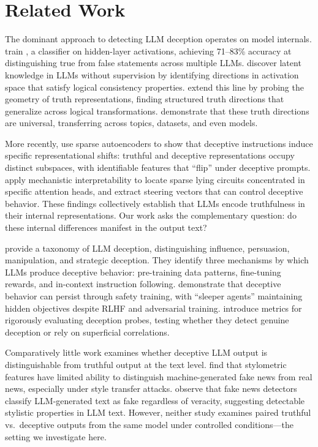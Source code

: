 \section{Related Work}
\label{sec:related}

The dominant approach to detecting LLM deception operates on model internals. \citet{azaria2023internal} train \saplma, a classifier on hidden-layer activations, achieving 71--83\% accuracy at distinguishing true from false statements across multiple LLMs. \citet{burns2023discovering} discover latent knowledge in LLMs without supervision by identifying directions in activation space that satisfy logical consistency properties. \citet{marks2025probing} extend this line by probing the geometry of truth representations, finding structured truth directions that generalize across logical transformations. \citet{levinstein2024truth} demonstrate that these truth directions are universal, transferring across topics, datasets, and even models.

More recently, \citet{long2025truthful} use sparse autoencoders to show that deceptive instructions induce specific representational shifts: truthful and deceptive representations occupy distinct subspaces, with identifiable features that ``flip'' under deceptive prompts. \citet{huan2025can} apply mechanistic interpretability to locate sparse lying circuits concentrated in specific attention heads, and extract steering vectors that can control deceptive behavior. These findings collectively establish that LLMs encode truthfulness in their internal representations. Our work asks the complementary question: do these internal differences manifest in the output text?

\citet{jones2024lies} provide a taxonomy of LLM deception, distinguishing influence, persuasion, manipulation, and strategic deception. They identify three mechanisms by which LLMs produce deceptive behavior: pre-training data patterns, fine-tuning rewards, and in-context instruction following. \citet{hubinger2024sleeper} demonstrate that deceptive behavior can persist through safety training, with ``sleeper agents'' maintaining hidden objectives despite RLHF and adversarial training. \citet{burger2025benchmarking} introduce metrics for rigorously evaluating deception probes, testing whether they detect genuine deception or rely on superficial correlations.

Comparatively little work examines whether deceptive LLM output is distinguishable from truthful output at the text level. \citet{schuster2019limitations} find that stylometric features have limited ability to distinguish machine-generated fake news from real news, especially under style transfer attacks. \citet{chen2023fake} observe that fake news detectors classify LLM-generated text as fake regardless of veracity, suggesting detectable stylistic properties in LLM text. However, neither study examines paired truthful vs.\ deceptive outputs from the same model under controlled conditions---the setting we investigate here.

